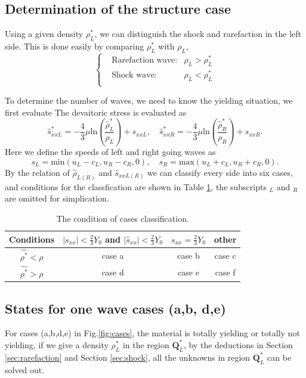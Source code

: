 \documentclass[review]{elsarticle}
\begin{document}
\subsection{Determination of the  structure case}

Using a given density $\rho^*_L$, we can distinguish the shock and rarefaction in the left side.  This is done easily by comparing $\rho^*_L$ with $\rho_L$,
\begin{equation}
  \left\{
  \begin{aligned}
  & \text{Rarefaction wave:} & \rho_L > \rho_L^*\\
  & \text{Shock wave:} &  \rho_L < \rho_L^*\\
\end{aligned}\right.
\end{equation}

To determine the number of waves, we need to know the yielding situation, we first evaluate 
The devaitoric stress is evaluated as 
\begin{equation}  \label{sxx1}
  \hat{s}_{xxL}^*=-\frac{4}{3}\mu\text{ln}(\frac{\hat{\rho}_L^*}{\rho_L})+s_{xxL}, \quad   \hat{s}_{xxR}^*=-\frac{4}{3}\mu\text{ln}(\frac{\hat{\rho}_R^*}{\rho_R})+s_{xxR}.
\end{equation}
Here we define the speeds of left and right going waves as
 \begin{equation}
      s_L = \text{min} (u_L-c_L, u_R-c_R, 0),  \quad s_R = \text{max}(u_L+c_L, u_R+c_R, 0).
\end{equation}
By  the relation of $\hat{\rho}_{L(R)}$ and  $\hat{s}_{xxL(R)}$ we can classify every side into six cases, and conditions for the classfication are  shown in Table \ref{tab:cases}, the  subscripts $_L$ and  $_R$  are omitted for simplication. 

\begin{table}
  \centering 
  \caption{The condition of  cases classification.}
  \begin{tabular}{c|ccc}
	\toprule
	Conditions & $|s_{xx}|<\frac{2}{3}Y_0$ and $|\hat{s}_{xx}|<\frac{2}{3}Y_0$ & $s_{xx}=\frac{2}{3}Y_0$&  other\\
  \midrule
  $\hat{\rho^*} <\rho$ & case a& case b& case c \\
  $\hat{\rho^*} >\rho$ & case d& case e& case f \\
  \bottomrule
\end{tabular}
\label{tab:cases}
\end{table}

\subsection{States for one wave cases (a,b, d,e)}\label{sec:one}
For cases (a,b,d,e) in Fig.\ref{fig:cases}, the material is totally yielding or totally not yielding, if we give a density $\rho_L^*$ in the region $\mathbf{Q}_L^*$, by the deductions in Section \ref{sec:rarefaction} and Section \ref{sec:shock}, all the unknowns in region $\mathbf{Q}_L^*$ can be solved out.
\end{document}

